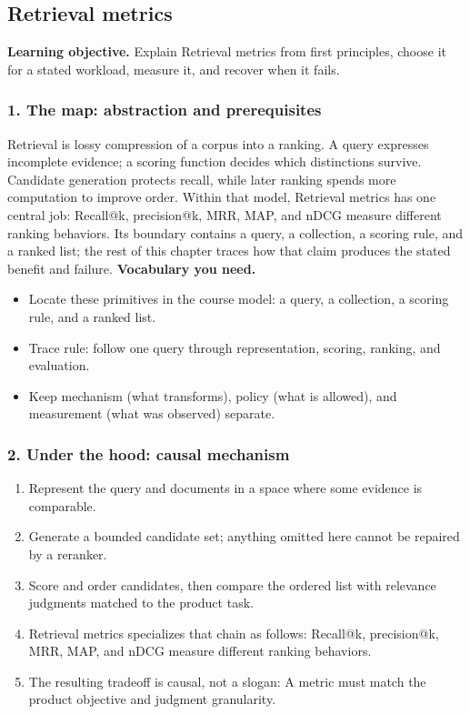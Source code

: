 \subsection{Retrieval metrics}
\textbf{Learning objective.} Explain Retrieval metrics from first principles, choose it for a stated workload, measure it, and recover when it fails.
\subsubsection*{1. The map: abstraction and prerequisites}
Retrieval is lossy compression of a corpus into a ranking. A query expresses incomplete evidence; a scoring function decides which distinctions survive. Candidate generation protects recall, while later ranking spends more computation to improve order.
Within that model, Retrieval metrics has one central job: Recall@k, precision@k, MRR, MAP, and nDCG measure different ranking behaviors. Its boundary contains a query, a collection, a scoring rule, and a ranked list; the rest of this chapter traces how that claim produces the stated benefit and failure.
\textbf{Vocabulary you need.}\begin{itemize}
\item Locate these primitives in the course model: a query, a collection, a scoring rule, and a ranked list.
\item Trace rule: follow one query through representation, scoring, ranking, and evaluation.
\item Keep mechanism (what transforms), policy (what is allowed), and measurement (what was observed) separate.
\end{itemize}
\subsubsection*{2. Under the hood: causal mechanism}\begin{enumerate}
\item Represent the query and documents in a space where some evidence is comparable.
\item Generate a bounded candidate set; anything omitted here cannot be repaired by a reranker.
\item Score and order candidates, then compare the ordered list with relevance judgments matched to the product task.
\item Retrieval metrics specializes that chain as follows: Recall@k, precision@k, MRR, MAP, and nDCG measure different ranking behaviors.
\item The resulting tradeoff is causal, not a slogan: A metric must match the product objective and judgment granularity.
\end{enumerate}
